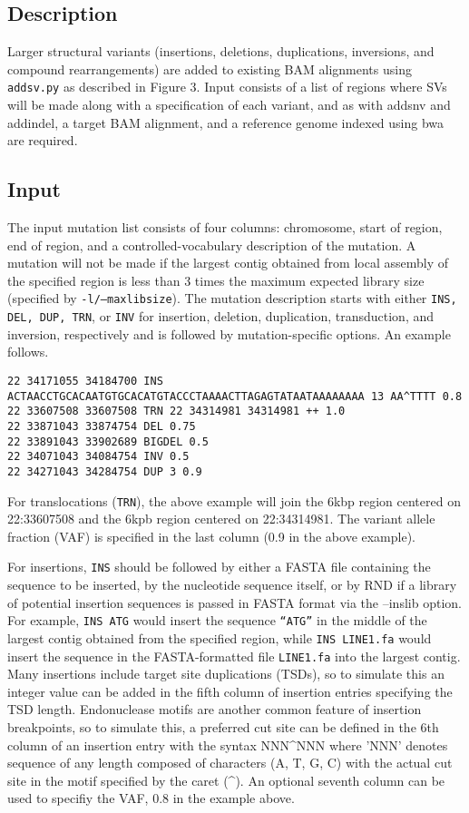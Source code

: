 \documentclass[letterpaper,11pt]{article}
\begin{document}
\subsection{Description}
   Larger structural variants (insertions, deletions, duplications, inversions, and compound rearrangements) are added to existing BAM alignments using \texttt{addsv.py} as described in Figure 3. Input consists of a list of regions where SVs will be made along with a specification of each variant, and as with addsnv and addindel, a target BAM alignment, and a reference genome indexed using bwa are required.

\subsection{Input}
    The input mutation list consists of four columns: chromosome, start of region, end of region, and a controlled-vocabulary description of the mutation. A mutation will not be made if the largest contig obtained from local assembly of the specified region is less than 3 times the maximum expected library size (specified by \texttt{-l/--maxlibsize}). The mutation description starts with either \texttt{INS, DEL, DUP, TRN}, or \texttt{INV} for insertion, deletion, duplication, transduction, and inversion, respectively and is followed by mutation-specific options. An example follows.

\begin{verbatim}
22 34171055 34184700 INS ACTAACCTGCACAATGTGCACATGTACCCTAAAACTTAGAGTATAATAAAAAAAA 13 AA^TTTT 0.8
22 33607508 33607508 TRN 22 34314981 34314981 ++ 1.0
22 33871043 33874754 DEL 0.75
22 33891043 33902689 BIGDEL 0.5
22 34071043 34084754 INV 0.5
22 34271043 34284754 DUP 3 0.9
\end{verbatim}

   For translocations (\texttt{TRN}), the above example will join the 6kbp region centered on 22:33607508 and the 6kpb region centered on 22:34314981. The variant allele fraction (VAF) is specified in the last column (0.9 in the above example).

    For insertions, \texttt{INS} should be followed by either a FASTA file containing the sequence to be inserted, by the nucleotide sequence itself, or by RND if a library of potential insertion sequences is passed in FASTA format via the --inslib option. For example, \texttt{INS ATG} would insert the sequence \texttt{``ATG''} in the middle of the largest contig obtained from the specified region, while \texttt{INS LINE1.fa} would insert the sequence in the FASTA-formatted file \texttt{LINE1.fa} into the largest contig. Many insertions include target site duplications (TSDs), so to simulate this an integer value can be added in the fifth column of insertion entries specifying the TSD length. Endonuclease motifs are another common feature of insertion breakpoints, so to simulate this, a preferred cut site can be defined in the 6th column of an insertion entry with the syntax NNN\^{}NNN where 'NNN' denotes sequence of any length composed of characters (A, T, G, C) with the actual cut site in the motif specified by the caret (\^{}). An optional seventh column can be used to specifiy the VAF, 0.8 in the example above.
    
\end{document}
